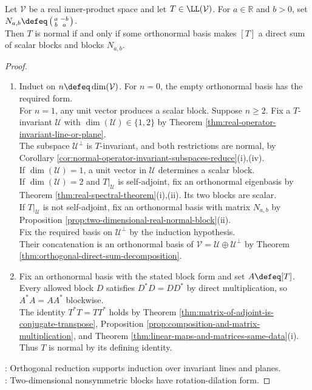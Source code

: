 \begin{theorem} \label{thm:real-normal-operator-block-diagonal-form} \\
Let $\mathcal{V}$ be a real inner-product space and let $T\in\LL(\mathcal{V})$. For $a\in\mathbb{R}$ and $b>0$, set $N_{a,b}\defeq\left(\begin{smallmatrix}a&-b\\b&a\end{smallmatrix}\right)$.\\
Then $T$ is normal if and only if some orthonormal basis makes $[T]$ a direct sum of scalar blocks and blocks $N_{a,b}$.
\begin{proof}
\begin{enumerate}[label=\roman*.]
\setlength{\itemsep}{0pt}
\item[$(\Rightarrow)$] Induct on $n\defeq\dim(\mathcal{V})$. For $n=0$, the empty orthonormal basis has the required form.\\
For $n=1$, any unit vector produces a scalar block. Suppose $n\geq2$. Fix a $T$-invariant $\mathcal{U}$ with $\dim(\mathcal{U})\in\{1,2\}$ by Theorem \ref{thm:real-operator-invariant-line-or-plane}.\\
The subspace $\mathcal{U}^{\perp}$ is $T$-invariant, and both restrictions are normal, by Corollary \ref{cor:normal-operator-invariant-subspaces-reduce}(i),(iv).\\
If $\dim(\mathcal{U})=1$, a unit vector in $\mathcal{U}$ determines a scalar block.\\
If $\dim(\mathcal{U})=2$ and $T|_{\mathcal{U}}$ is self-adjoint, fix an orthonormal eigenbasis by Theorem \ref{thm:real-spectral-theorem}(i),(ii). Its two blocks are scalar.\\
If $T|_{\mathcal{U}}$ is not self-adjoint, fix an orthonormal basis with matrix $N_{a,b}$ by Proposition \ref{prop:two-dimensional-real-normal-block}(ii).\\
Fix the required basis on $\mathcal{U}^{\perp}$ by the induction hypothesis.\\
Their concatenation is an orthonormal basis of $\mathcal{V}=\mathcal{U}\oplus\mathcal{U}^{\perp}$ by Theorem \ref{thm:orthogonal-direct-sum-decomposition}.
\item[$(\Leftarrow)$] Fix an orthonormal basis with the stated block form and set $A\defeq[T]$.\\
Every allowed block $D$ satisfies $D^*D=DD^*$ by direct multiplication, so $A^*A=AA^*$ blockwise.\\
The identity $T^*T=TT^*$ holds by Theorem \ref{thm:matrix-of-adjoint-is-conjugate-transpose}, Proposition \ref{prop:composition-and-matrix-multiplication}, and Theorem \ref{thm:linear-maps-and-matrices-same-data}(i).\\
Thus $T$ is normal by its defining identity.
\end{enumerate}
: Orthogonal reduction supports induction over invariant lines and planes.\\
: Two-dimensional nonsymmetric blocks have rotation-dilation form.
\end{proof}
\end{theorem}

